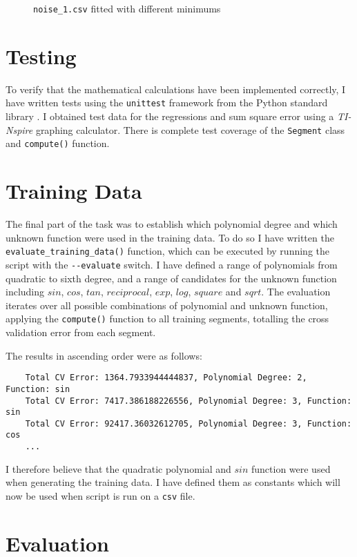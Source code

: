 \documentclass[11pt,a4paper]{scrartcl}
\begin{document}
\begin{figure}
	\centering
	\qquad
	\caption{\lstinline|noise_1.csv| fitted with different minimums}
	\label{fig:noise_1}
\end{figure}

\section{Testing}

To verify that the mathematical calculations have been implemented correctly, I have written tests using the \lstinline|unittest| framework from the Python standard library \cite{unittest}. I obtained test data for the regressions and sum square error using a \textit{TI-Nspire} graphing calculator. There is complete test coverage of the \lstinline|Segment| class and \lstinline|compute()| function.


\section{Training Data}

The final part of the task was to establish which polynomial degree and which unknown function were used in the training data. To do so I have written the \lstinline|evaluate_training_data()| function, which can be executed by running the script with the \lstinline|--evaluate| switch. I have defined a range of polynomials from quadratic to sixth degree, and a range of candidates for the unknown function including $sin$, $cos$, $tan$, $reciprocal$, $exp$, $log$, $square$ and $sqrt$. The evaluation iterates over all possible combinations of polynomial and unknown function, applying the \lstinline|compute()| function to all training segments, totalling the cross validation error from each segment.

The results in ascending order were as follows:

\begin{lstlisting}
	Total CV Error: 1364.7933944444837, Polynomial Degree: 2, Function: sin
	Total CV Error: 7417.386188226556, Polynomial Degree: 3, Function: sin
	Total CV Error: 92417.36032612705, Polynomial Degree: 3, Function: cos
	...
\end{lstlisting}

I therefore believe that the quadratic polynomial and $sin$ function were used when generating the training data. I have defined them as constants which will now be used when script is run on a \lstinline|csv| file.

\section{Evaluation}

\printbibliography
\end{document}

